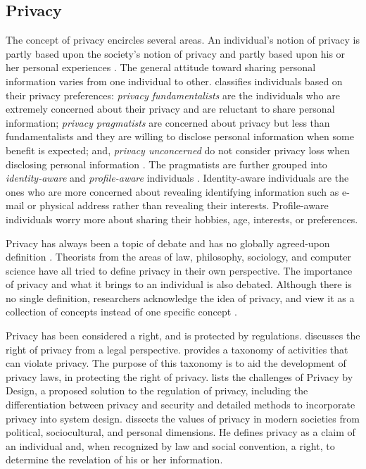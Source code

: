 \subsection{Privacy}
The concept of privacy encircles several areas. An individual's notion of
privacy is partly based upon the society's notion of privacy and partly
based upon his or her personal experiences \citep{westin1967privacy,
westin2003social}. The general attitude toward sharing personal
information varies from one individual to other.
\citet{westin1967privacy} classifies individuals based on their privacy
preferences: \textit{privacy fundamentalists} are the individuals who
are extremely concerned about their privacy and are reluctant to share
personal information; \textit{privacy pragmatists} are concerned about
privacy but less than fundamentalists and they are willing to disclose
personal information when some benefit is expected; and,
\textit{privacy unconcerned} do not consider privacy loss when
disclosing personal information \citep{westin1967privacy}. The
pragmatists are further grouped into \emph{identity-aware} and \emph{profile-aware}
individuals \citep{spiekermann2009enggprivacy}. Identity-aware
individuals are the ones who are more concerned about revealing
identifying information such as e-mail or physical address rather than
revealing their interests. Profile-aware individuals worry more about
sharing their hobbies, age, interests, or preferences.

Privacy has always been a topic of debate and has no globally
agreed-upon definition \citep{smith2007privacy}. Theorists from the
areas of law, philosophy, sociology, and computer science have all tried
to define privacy in their own perspective.
The importance of privacy and what it brings to an individual is also
debated. Although there is no single definition, researchers 
acknowledge the idea of privacy, and view it as a
collection of concepts instead of one specific concept
\citep{smith2007privacy}. 

Privacy has been considered a right, and is protected by regulations. 
\citet{Prosser-60:Privacy} discusses the right of privacy from a legal perspective. 
\citet{solove-2006-taxonomy} provides a taxonomy of activities that can violate privacy. 
The purpose of this taxonomy is to aid the development of privacy laws, in protecting the right of privacy.
\citet{Spiekermann-2012-Challenges+PrivacyDesign} lists the challenges of Privacy by Design, a proposed solution to the regulation of privacy, including the differentiation between privacy and security and detailed methods to incorporate privacy into system design. 
\citet{westin2003social} dissects the values of privacy in modern societies from political, sociocultural, and personal dimensions.
He defines privacy as a claim of an individual and, when recognized by law and social convention, a right, to determine the revelation of his or her information.


